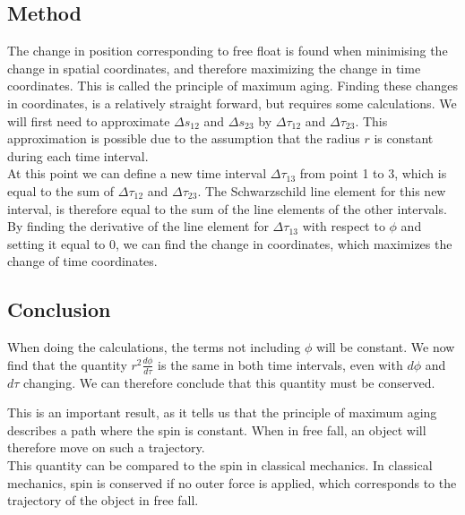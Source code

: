 \documentclass[reprint,english,notitlepage]{revtex4-2}
\begin{document}
    \subsection{Method}\label{subsec:method2}
        The change in position corresponding to free float is found when minimising the change in spatial coordinates, and therefore maximizing the change in time coordinates.
        This is called the principle of maximum aging.
        Finding these changes in coordinates, is a relatively straight forward, but requires some calculations.
        We will first need to approximate $\Delta s_{12}$ and $\Delta s_{23}$ by $\Delta \tau_{12}$ and $\Delta \tau_{23}$.
        This approximation is possible due to the assumption that the radius $r$ is constant during each time interval.\\

        At this point we can define a new time interval $\Delta \tau_{13}$ from point 1 to 3, which is equal to the sum of $\Delta \tau_{12}$ and $\Delta\tau_{23}$.
        The Schwarzschild line element for this new interval, is therefore equal to the sum of the line elements of the other intervals.\\

        By finding the derivative of the line element for $\Delta \tau_{13}$ with respect to $\phi$ and setting it equal to 0, we can find the change in coordinates, which maximizes the change of time coordinates.

    \subsection{Conclusion}\label{subsec:conclusion2}
        When doing the calculations, the terms not including $\phi$ will be constant.
        We now find that the quantity $r^2 \frac{d\phi}{d\tau}$ is the same in both time intervals, even with $d\phi$ and $d\tau$ changing.
        We can therefore conclude that this quantity must be conserved.

        This is an important result, as it tells us that the principle of maximum aging describes a path where the spin is constant.
        When in free fall, an object will therefore move on such a trajectory.\\

        This quantity can be compared to the spin in classical mechanics.
        In classical mechanics, spin is conserved if no outer force is applied, which corresponds to the trajectory of the object in free fall.
\end{document}

